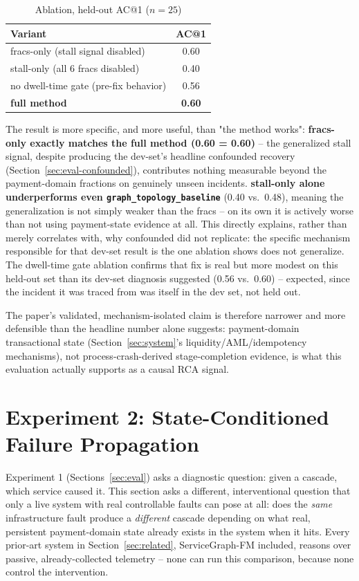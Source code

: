 \documentclass[conference]{IEEEtran}
\begin{document}
\begin{table}[h]
\centering
\caption{Ablation, held-out AC@1 ($n=25$)}
\begin{tabular}{lc}
\toprule
Variant & AC@1 \\
\midrule
fracs-only (stall signal disabled) & 0.60 \\
stall-only (all 6 fracs disabled) & 0.40 \\
no dwell-time gate (pre-fix behavior) & 0.56 \\
\textbf{full method} & \textbf{0.60} \\
\bottomrule
\end{tabular}
\end{table}

The result is more specific, and more useful, than "the method works":
\textbf{fracs-only exactly matches the full method (0.60 = 0.60)} -- the
generalized stall signal, despite producing the dev-set's headline
confounded recovery (Section~\ref{sec:eval-confounded}), contributes
nothing measurable beyond the payment-domain fractions on genuinely
unseen incidents. \textbf{stall-only alone underperforms even
\texttt{graph\_topology\_baseline}} (0.40 vs.\ 0.48), meaning the
generalization is not simply weaker than the fracs -- on its own it is
actively worse than not using payment-state evidence at all. This
directly explains, rather than merely correlates with, why confounded did
not replicate: the specific mechanism responsible for that dev-set result
is the one ablation shows does not generalize. The dwell-time gate ablation
confirms that fix is real but more modest on this held-out set than its
dev-set diagnosis suggested (0.56 vs.\ 0.60) -- expected, since the
incident it was traced from was itself in the dev set, not held out.

The paper's validated, mechanism-isolated claim is therefore narrower and
more defensible than the headline number alone suggests: payment-domain
transactional state (Section~\ref{sec:system}'s liquidity/AML/idempotency
mechanisms), not process-crash-derived stage-completion evidence, is what
this evaluation actually supports as a causal RCA signal.

\section{Experiment 2: State-Conditioned Failure Propagation}
\label{sec:exp2}

Experiment 1 (Sections~\ref{sec:eval}) asks a diagnostic question: given a
cascade, which service caused it. This section asks a different,
interventional question that only a live system with real controllable
faults can pose at all: does the \emph{same} infrastructure fault produce
a \emph{different} cascade depending on what real, persistent
payment-domain state already exists in the system when it hits. Every
prior-art system in Section~\ref{sec:related}, ServiceGraph-FM included,
reasons over passive, already-collected telemetry -- none can run this
comparison, because none control the intervention.
\end{document}
